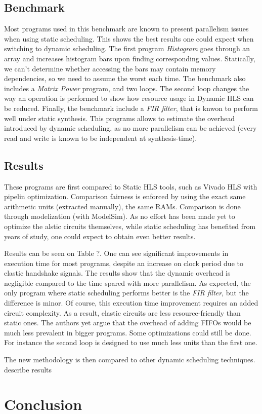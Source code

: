 \documentclass{article}
\def\todo#1{{\color{red}#1}}
\begin{document}
\subsection{Benchmark}
Most programs used in this benchmark are known to present parallelism issues when using static scheduling. This shows the best results one could expect when switching to dynamic scheduling.
The first program \textit{Histogram} goes through an array and increases histogram bars upon finding corresponding values. Statically, we can't determine whether accessing the bars may contain memory dependencies, so we need to assume the worst each time.
The benchmark also includes a \textit{Matrix Power} program, and two loops. The second loop changes the way an operation is performed to show how resource usage in Dynamic HLS can be reduced.
Finally, the benchmark include a \textit{FIR filter}, that is knwon to perform well under static synthesis. This programs allows to estimate the overhead introduced by dynamic scheduling, as no more parallelism can be achieved (every read and write is known to be independent at synthesis-time).

\subsection{Results}
These programs are first compared to Static HLS tools, such as Vivado HLS with pipelin optimization. Comparison fairness is enforced by using the exact same arithmetic units (extracted manually), the same RAMs.
Comparison is done through modelization (with ModelSim).
As no effort has been made yet to optimize the alstic circuits themselves, while static scheduling has benefited from years of study, one could expect to obtain even better results.

Results can be seen on Table ?. One can see significant improvements in execution time for most programs, despite an increase on clock period due to elastic handshake signals.
The results show that the dynamic overhead is negligible compared to the time spared with more parallelism. As expected, the only program where static scheduling performs better is the \textit{FIR filter}, but the difference is minor.
Of course, this execution time improvement requires an added circuit complexity. As a result, elastic circuits are less resource-friendly than static ones. The authors yet argue that the overhead of adding FIFOs would be much less prevalent in bigger programs. Some optimizations could still be done. For instance the second loop is designed to use much less units than the first one.

The new methodology is then compared to other dynamic scheduling techniques.
\todo{describe results}

\section{Conclusion}
\end{document}
